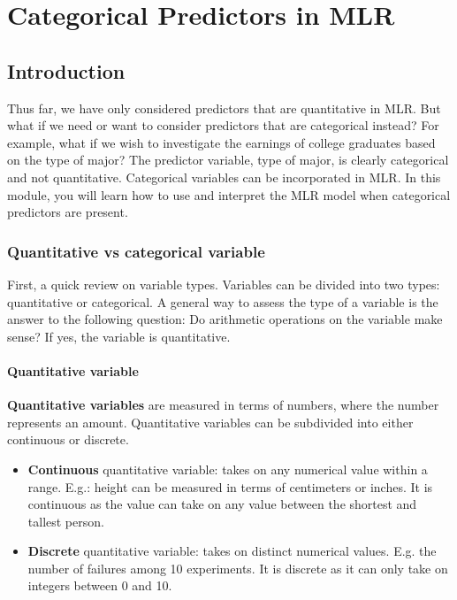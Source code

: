 \documentclass[
]{book}
\providecommand{\tightlist}{%
  \setlength{\itemsep}{0pt}\setlength{\parskip}{0pt}}
\begin{document}
\hypertarget{cat}{%
\chapter{Categorical Predictors in MLR}\label{cat}}

\hypertarget{introduction-7}{%
\section{Introduction}\label{introduction-7}}

Thus far, we have only considered predictors that are quantitative in MLR. But what if we need or want to consider predictors that are categorical instead? For example, what if we wish to investigate the earnings of college graduates based on the type of major? The predictor variable, type of major, is clearly categorical and not quantitative. Categorical variables can be incorporated in MLR. In this module, you will learn how to use and interpret the MLR model when categorical predictors are present.

\hypertarget{quantitative-vs-categorical-variable}{%
\subsection{Quantitative vs categorical variable}\label{quantitative-vs-categorical-variable}}

First, a quick review on variable types. Variables can be divided into two types: quantitative or categorical. A general way to assess the type of a variable is the answer to the following question: Do arithmetic operations on the variable make sense? If yes, the variable is quantitative.

\hypertarget{quantitative-variable}{%
\subsubsection{Quantitative variable}\label{quantitative-variable}}

\textbf{Quantitative variables} are measured in terms of numbers, where the number represents an amount. Quantitative variables can be subdivided into either continuous or discrete.

\begin{itemize}
\tightlist
\item
  \textbf{Continuous} quantitative variable: takes on any numerical value within a range. E.g.: height can be measured in terms of centimeters or inches. It is continuous as the value can take on any value between the shortest and tallest person.
\item
  \textbf{Discrete} quantitative variable: takes on distinct numerical values. E.g. the number of failures among 10 experiments. It is discrete as it can only take on integers between 0 and 10.
\end{itemize}
\end{document}
